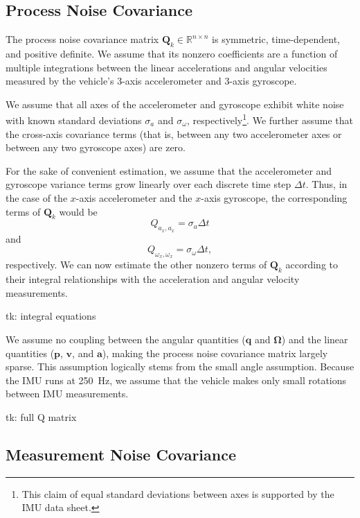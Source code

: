 \subsection{Process Noise Covariance} \label{sec:Q_Matrix}

The process noise covariance matrix $\mathbf{Q}_{k} \in \mathbb{R}^{n \times n}$ is symmetric, time-dependent, and positive definite. We assume that its nonzero coefficients are a function of multiple integrations between the linear accelerations and angular velocities measured by the vehicle's 3-axis accelerometer and 3-axis gyroscope.

We assume that all axes of the accelerometer and gyroscope exhibit white noise with known standard deviations $\sigma_{a}$ and $\sigma_{\omega}$, respectively\footnote{This claim of equal standard deviations between axes is supported by the IMU data sheet.}. We further assume that the cross-axis covariance terms (that is, between any two accelerometer axes or between any two gyroscope axes) are zero.

For the sake of convenient estimation, we assume that the accelerometer and gyroscope variance terms grow linearly over each discrete time step $\Delta t$. Thus, in the case of the $x$-axis accelerometer and the $x$-axis gyroscope, the corresponding terms of $\mathbf{Q}_{k}$ would be
%
\begin{equation}
Q_{a_{x},a_{x}} = \sigma_{a} \Delta t
\end{equation}
%
and
%
\begin{equation}
Q_{\omega_{x},\omega_{x}} = \sigma_{\omega} \Delta t ,
\end{equation}
%
respectively. We can now estimate the other nonzero terms of $\mathbf{Q}_{k}$ according to their integral relationships with the acceleration and angular velocity measurements.

tk: integral equations

We assume no coupling between the angular quantities ($\mathbf{q}$ and $\mathbf{\Omega}$) and the linear quantities ($\mathbf{p}$, $\mathbf{v}$, and $\mathbf{a}$), making the process noise covariance matrix largely sparse. This assumption logically stems from the small angle assumption. Because the IMU runs at 250~Hz, we assume that the vehicle makes only small rotations between IMU measurements. 

tk: full Q matrix


\subsection{Measurement Noise Covariance} \label{sec:R_Matrix}

